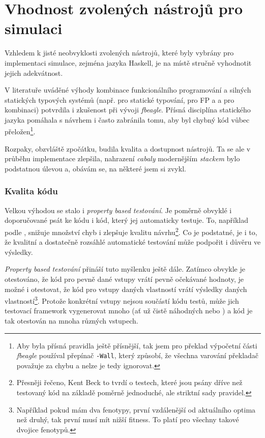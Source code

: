 \section{Vhodnost zvolených nástrojů pro simulaci}

Vzhledem k jisté neobvyklosti zvolených nástrojů, které byly vybrány pro implementaci simulace, zejména jazyka Haskell,
je na místě stručně vyhodnotit jejich adekvátnost.

V literatuře uváděné výhody kombinace funkcionálního programování a silných statických typových systémů (např. \citet{meijer2004static} pro
statické typování, \citet{hughes1989functional} pro FP a \citet{Chiusano2016} a \citet{ray2014large} pro kombinaci)
potvrdila i zkušenost při vývoji
\textit{fbeagle}. Přísná disciplína statického jazyka pomáhala s návrhem i často zabránila tomu, aby byl chybný kód vůbec přeložen\footnote{
Aby byla přísná pravidla ještě přísnější, tak jsem pro překlad výpočetní části \textit{fbeagle} používal přepínač \texttt{-Wall}, který způsobí,
že všechna varování překladač považuje za chybu a nelze je tedy ignorovat.
}.

Rozpaky, obzvláště zpočátku, budila kvalita a dostupnost nástrojů. Ta se ale v průběhu implementace zlepšila, nahrazení \textit{cabaly} modernějším
\textit{stackem} bylo podstatnou úlevou a, obávám se, na některé  jsem si zvykl.

\subsubsection{Kvalita kódu}

Velkou výhodou se stalo i \textit{property based testování}. Je poměrně obvyklé i doporučované \citep{williams2009effectiveness} psát ke kódu i kód, který jej
automaticky testuje. To, například podle \citet{beck2003test}, snižuje množství chyb i zlepšuje kvalitu návrhu\footnote{
Přesněji řečeno, Kent Beck to tvrdí o testech, které jsou psány dříve než testovaný kód na základě poměrně jednoduché,
ale striktní sady pravidel.}.
Co je podstatné, je i to, že kvalitní a dostatečně rozsáhlé automatické testování může podpořit i důvěru ve výsledky.

\textit{Property based testování} přináší tuto myšlenku ještě dále. Zatímco obvykle je otestováno, že kód pro pevně dané vstupy vrátí pevně
očekávané hodnoty, je možné i otestovat, že kód pro vstupy daných vlastností vrátí výsledky daných vlastností\footnote{
Například pokud mám dva fenotypy, první vzdálenější od aktuálního optima než druhý, tak první musí mít nižší fitness.
To platí pro všechny takové dvojice fenotypů.
}. Protože konkrétní vstupy nejsou součástí kódu testů, může jich testovací framework vygenerovat mnoho (ať už čistě náhodných nebo )
a kód je tak otestován na mnoha různých vstupech.

